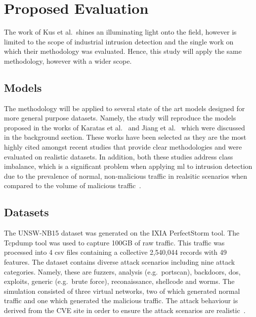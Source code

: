 \chapter{Proposed Evaluation}%
\label{chp:evaluation}

The work of Kus et al.\ shines an illuminating light onto the field, however is
limited to the scope of industrial intrusion detection and the single work on
which their methodology was evaluated. Hence, this study will apply the same
methodology, however with a wider scope.

\section{Models}%
\label{sec:models}

The methodology will be applied to several state of the art models designed for
more general purpose datasets. Namely, the study will reproduce the models
proposed in the works of Karatas et al.~\cite{Karatas} and Jiang et
al.~\cite{Jiang} which were discussed in the background section. These works
have been selected as they are the most highly cited amongst recent studies
that provide clear methodologies and were evaluated on realistic datasets. In
addition, both these studies address class imbalance, which is a significant
problem when applying \gls{ml} to intrusion detection due to the prevalence of
normal, non-malicious traffic in realsitic scenarios when compared to the
volume of malicious traffic~\cite{imbalance}.

\section{Datasets}%
\label{sec:datasets}

The UNSW-NB15 dataset was generated on the IXIA PerfectStorm tool. The Tcpdump
tool was used to capture 100GB of raw traffic. This traffic was processed into
4 csv files containing a collective 2,540,044 records with 49 features. The
dataset contains diverse attack scenarios including nine attack categories.
Namely, these are fuzzers, analysis (e.g.\ portscan), backdoors, \gls{dos},
exploits, generic (e.g.\ brute force), reconaissance, shellcode and worms. The
simulation consisted of three virtual networks, two of which generated normal
traffic and one which generated the malicious traffic. The attack behaviour is
derived from the CVE site in order to ensure the attack scenarios are
realistic~\cite{unsw15}.

